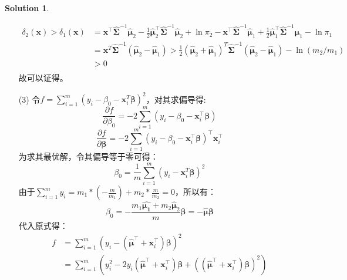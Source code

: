\documentclass[a4paper,UTF8]{article}
\theoremstyle{definition}
\newtheorem*{solution}{Solution}
\begin{document}
\begin{solution}
\begin{enumerate}
		      \begin{align*}
			      \delta_2(\bm{x})> \delta_1(\bm{x}) & = \boldsymbol{x}^{\top} \hat{\bm{\Sigma}}^{-1} \hat{\boldsymbol{\mu}}_{2}-\frac{1}{2} \hat{\boldsymbol{\mu}}_{2}^{\top} \hat{\bm{\Sigma}}^{-1} \hat{\boldsymbol{\mu}}_{2}+\ln \pi_{2}-\boldsymbol{x}^{\top} \hat{\bm{\Sigma}}^{-1} \hat{\boldsymbol{\mu}}_{1}+\frac{1}{2} \hat{\boldsymbol{\mu}}_{1}^{\top} \hat{\bm{\Sigma}}^{-1} \hat{\boldsymbol{\mu}}_{1}-\ln \pi_{1} \\
			                                         & = \bm{x}^{T} \hat{\bm{\Sigma}}^{-1}\left(\hat{\bm{\mu}}_{2}-\hat{\bm{\mu}}_{1}\right)>\frac{1}{2}\left(\hat{\bm{\mu}}_{2}+\hat{\bm{\mu}}_{1}\right)^{T} \hat{\bm{\Sigma}}^{-1}\left(\hat{\bm{\mu}}_{2}-\hat{\bm{\mu}}_{1}\right)-\ln \left(m_{2} / m_{1}\right)                                                                                                           \\
			                                         & > 0                                                                                                                                                                                                                                                                                                                                                                       \\
		      \end{align*}
		      故可以证得。
		\item [(3)]
		      令$f=\sum_{i=1}^m(y_i-\beta_0-\bm{x}_i^T\bm{\beta})^2$，对其求偏导得:
		      \[\frac{\partial f}{\partial \beta_{0}}= - 2 \sum_{i=1}^{m}\left(y_{i}-\beta_{0}-\boldsymbol{x}_{i}^{\top} \boldsymbol{\beta}\right)\]
		      \[\frac{\partial f}{\partial \boldsymbol{\beta}}=-2 \sum_{i=1}^{m}\left(y_{i}-\beta_{0}-\boldsymbol{x}_{i}^{\top} \boldsymbol{\beta}\right)^{\top} \boldsymbol{x}_{i}^{\top}\]
		      为求其最优解，令其偏导等于零可得：
		      \[\beta_0= \frac{1}{m}\sum_{i=1}^m(y_i-\bm{x}_i^T\bm{\beta})^2\]
		      由于$\sum_{i=1}^my_i=m_1*(-\frac{m}{m_1})+m_2 * \frac{m}{m_2}=0$，所以有：
		      \[\beta_0=-\frac{m_1\hat{\bm{\mu_1}}+m_2\hat{\bm{\mu}}_2}{m}\bm{\beta}=-\hat{\bm{\mu}}\bm{\beta}\]
		      代入原式得：
		      \begin{align*}
			      f & = \sum_{i=1}^{m}\left(y_{i}-\left(\hat{\boldsymbol{\mu}}^{\top}+\boldsymbol{x}_{i}^{\top}\right) \boldsymbol{\beta}\right)^{2}       \\
			        & = \sum_{i=1}^m(y_i^2-2y_i(\hat{\bm{\mu}}^{\top}+\bm{x}_i^{\top})\bm{\beta}+((\hat{\bm{\mu}}^{\top}+\bm{x}_i^{\top})\bm{\beta})^2)    \\

\end{align*}
\end{enumerate}
\end{solution}
\end{document}
